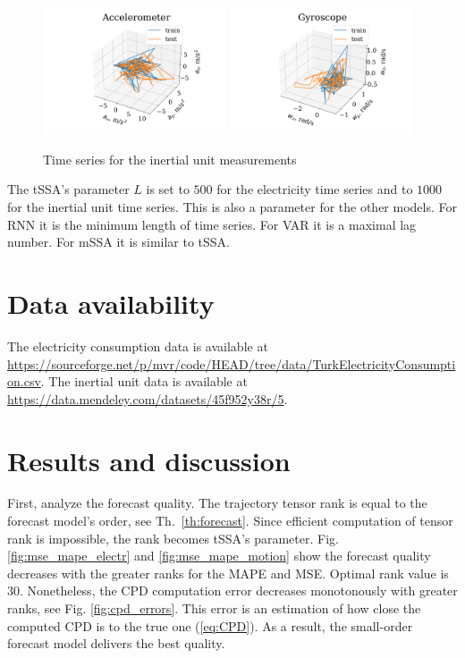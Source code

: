 \documentclass[referee, pdflatex, sn-mathphys-num]{sn-jnl}
\theoremstyle{definition}
\theoremstyle{plain}
\begin{document}
	\begin{figure}[!htbp]
		\centering
		\includegraphics[width=0.48\textwidth, keepaspectratio]{acceleromter_example.png}
		\includegraphics[width=0.48\textwidth, keepaspectratio]{gyro_example.png}
		\caption{Time series for the inertial unit measurements}\label{fig:motion_data}
	\end{figure}
	
	The tSSA's parameter $ L $ is set to $ 500 $ for the electricity time series and to $ 1000 $ for the inertial unit time series. This is also a parameter for the other models. For RNN it is the minimum length of time series. For VAR it is a maximal lag number. For mSSA it is similar to tSSA.
	
	\section{Data availability}
	
	The electricity consumption data is available at \url{https://sourceforge.net/p/mvr/code/HEAD/tree/data/TurkElectricityConsumption.csv}. The inertial unit data is available at \url{https://data.mendeley.com/datasets/45f952y38r/5}.
	
	\section{Results and discussion}
	
	First, analyze the forecast quality. The trajectory tensor rank is equal to the forecast model's order, see Th.~\ref{th:forecast}. Since efficient computation of tensor rank is impossible, the rank becomes tSSA's parameter. Fig. \ref{fig:mse_mape_electr} and \ref{fig:mse_mape_motion} show the forecast quality decreases with the greater ranks for the MAPE and MSE. Optimal rank value is 30. Nonetheless, the CPD computation error decreases monotonously with greater ranks, see Fig. \ref{fig:cpd_errors}. This error is an estimation of how close the computed CPD is to the true one (\ref{eq:CPD}). As a result, the small-order forecast model delivers the best quality. 
\end{document}
